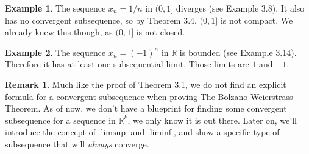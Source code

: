 \documentclass{article}
\newcommand{\R}{\mathbb{R}}
\theoremstyle{definition}
\newtheorem{example}{Example}[section]
\newtheorem{remark}{Remark}[section]
\begin{document}
\begin{example}
	The sequence $ x_n=1/n $ in $(0,1] $ diverges (see Example 3.8). It also has no convergent subsequence, so by Theorem 3.4, $ (0,1] $ is not compact. We already knew this though, as $ (0,1] $ is not closed.
\end{example}
\begin{example}
	The sequence $ x_n=(-1)^n $ in $ \R $ is bounded (see Example 3.14). Therefore it has at least one subsequential limit. Those limits are $ 1 $ and $ -1 $.  
\end{example}
\begin{remark}
 Much like the proof of Theorem 3.1, we do not find an explicit formula for a convergent subsequence when proving The Bolzano-Weierstrass Theorem. As of now, we don't have a blueprint for finding some convergent subsequence for a sequence in $ \R^k $, we only know it is out there. Later on, we'll introduce the concept of $ \limsup $ and $ \liminf $, and show a specific type of subsequence that will \textit{always} converge. 
\end{remark}
\end{document}
